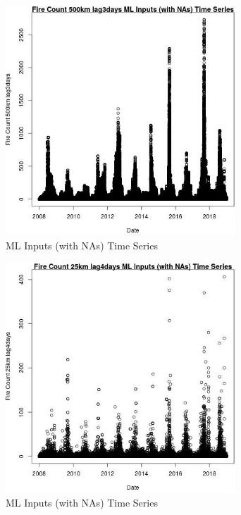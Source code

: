 \begin{figure} 
\centering  
\includegraphics[width=0.77\textwidth]{Code_Outputs/Report_ML_input_PM25_Step4_part_f_de_duplicated_aveswNAs_Fire_Count_500km_lag3daysvDate.jpg} 
\caption{\label{fig:Report_ML_input_PM25_Step4_part_f_de_duplicated_aveswNAsFire_Count_500km_lag3daysvDate}ML Inputs (with NAs) Time Series} 
\end{figure} 
 

\begin{figure} 
\centering  
\includegraphics[width=0.77\textwidth]{Code_Outputs/Report_ML_input_PM25_Step4_part_f_de_duplicated_aveswNAs_Fire_Count_25km_lag4daysvDate.jpg} 
\caption{\label{fig:Report_ML_input_PM25_Step4_part_f_de_duplicated_aveswNAsFire_Count_25km_lag4daysvDate}ML Inputs (with NAs) Time Series} 
\end{figure} 
 

